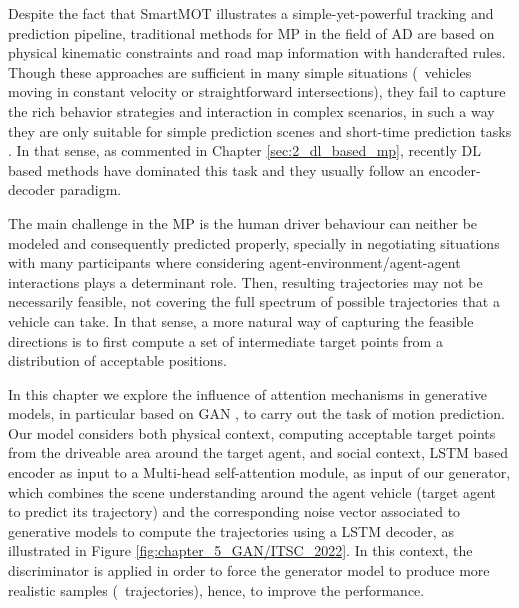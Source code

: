 Despite the fact that SmartMOT illustrates a simple-yet-powerful tracking and prediction pipeline, traditional methods for \ac{MP} in the field of \ac{AD} are based on physical kinematic constraints and road map information with handcrafted rules. Though these approaches are sufficient in many simple situations (\ie \ vehicles moving in constant velocity or straightforward intersections), they fail to capture the rich behavior strategies and interaction in complex scenarios, in such a way they are only suitable for simple prediction scenes and short-time prediction tasks \cite{huang2022survey}. In that sense, as commented in Chapter \ref{sec:2_dl_based_mp}, recently \ac{DL} based methods have dominated this task and they usually follow an encoder-decoder paradigm. 

The main challenge in the \ac{MP} is the human driver behaviour can neither be modeled and consequently predicted properly, specially in negotiating situations \cite{gomez2021train} \cite{mercat2020multi} with many participants where considering agent-environment/agent-agent interactions \cite{sadeghian2019sophie} plays a determinant role. Then, resulting trajectories may not be necessarily feasible, not covering the full spectrum of possible trajectories that a vehicle can take. In that sense, a more natural way of capturing the feasible directions \cite{dendorfer2020goal} is to first compute a set of intermediate target points from a distribution of acceptable positions. 

In this chapter we explore the influence of attention mechanisms in generative models, in particular based on \ac{GAN} \cite{goodfellow2020generative}, to carry out the task of motion prediction. Our model considers both physical context, computing acceptable target points from the driveable area around the target agent, and social context, \ac{LSTM} \cite{hochreiter1997long} based encoder as input to a Multi-head self-attention module, as input of our generator, which combines the scene understanding around the agent vehicle (target agent to predict its trajectory) and the corresponding noise vector associated to generative models to compute the trajectories using a LSTM decoder, as illustrated in Figure \ref{fig:chapter_5_GAN/ITSC_2022}. In this context, the discriminator is applied in order to force the generator model to produce more realistic samples (\ie \ trajectories), hence, to improve the performance. 

